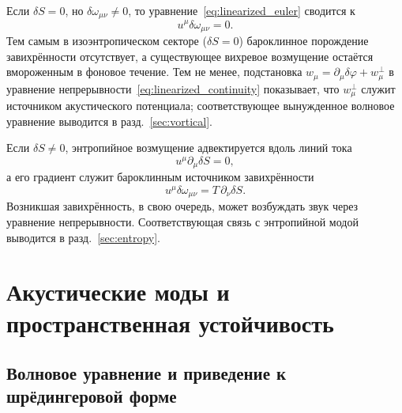 \documentclass[12pt,a4paper,preprint,nopreprintline]{elsarticle}
\begin{document}
Если $\delta S=0$, но $\delta\omega_{\mu\nu}\neq0$, то уравнение~\eqref{eq:linearized_euler} сводится к
\begin{equation}
    u^{\mu}\delta\omega_{\mu\nu}=0.
    \label{eq:vortex_frozen}
\end{equation}
Тем самым в изоэнтропическом секторе ($\delta S=0$) бароклинное порождение завихрённости отсутствует, а существующее вихревое возмущение остаётся вмороженным в фоновое течение. Тем не менее, подстановка $w_{\mu}=\partial_{\mu}\delta\varphi+w_{\mu}^{\perp}$ в уравнение непрерывности~\eqref{eq:linearized_continuity} показывает, что $w_{\mu}^{\perp}$ служит источником акустического потенциала; соответствующее вынужденное волновое уравнение выводится в разд.~\ref{sec:vortical}.

Если $\delta S\neq0$, энтропийное возмущение адвектируется вдоль линий тока
\begin{equation}
    u^{\mu}\partial_{\mu}\delta S=0,
    \label{eq:entropy_mode_advection}
\end{equation}
а его градиент служит бароклинным источником завихрённости
\begin{equation}
    u^{\mu}\delta\omega_{\mu\nu}
    =
    T\,\partial_{\nu}\delta S.
    \label{eq:entropy_vorticity_source}
\end{equation}
Возникшая завихрённость, в свою очередь, может возбуждать звук через уравнение непрерывности. Соответствующая связь с энтропийной модой выводится в разд.~\ref{sec:entropy}.

\section{Акустические моды и пространственная устойчивость}
\label{sec:acoustic}

\subsection{Волновое уравнение и приведение к шрёдингеровой форме}
\label{sec:acoustic_wave_equation}
\end{document}
